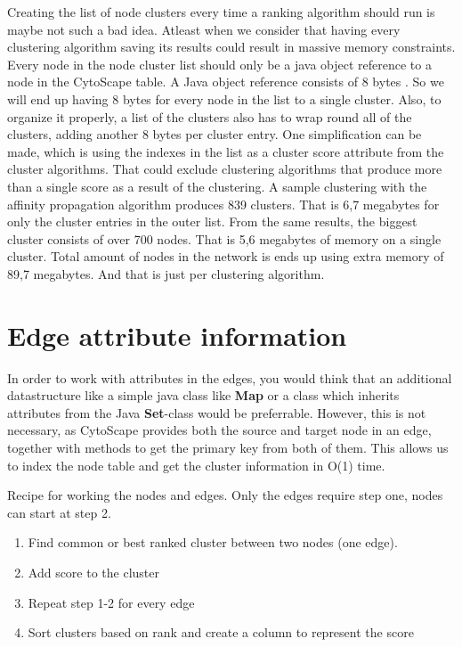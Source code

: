 Creating the list of node clusters every time a ranking algorithm should run is
maybe not such a bad idea. Atleast when we consider that having every clustering
algorithm saving its results could result in massive memory constraints. Every
node in the node cluster list should only be a java object reference to a node
in the CytoScape table. A Java object reference consists of 8 bytes
\cite{java-reference-size}. So we will end up having 8 bytes for every node in
the list to a single cluster. Also, to organize it properly, a list of the
clusters also has to wrap round all of the clusters, adding another 8 bytes per
cluster entry. One simplification can be made, which is using the indexes in the
list as a cluster score attribute from the cluster algorithms. That could
exclude clustering algorithms that produce more than a single score as a result
of the clustering. A sample clustering with the affinity propagation algorithm
produces 839 clusters. That is 6,7 megabytes for only the cluster entries in the
outer list. From the same results, the biggest cluster consists of over 700
nodes. That is 5,6 megabytes of memory on a single cluster. Total amount of
nodes in the network is ends up using extra memory of 89,7 megabytes. And that
is just per clustering algorithm.

\section{Edge attribute information}
In order to work with attributes in the edges, you would think that an
additional datastructure like a simple java class like \textbf{Map} or a class
which inherits attributes from the Java \textbf{Set}-class\cite{java-set} would
be preferrable. However, this is not necessary, as CytoScape provides both the
source and target node in an edge, together with methods to get the primary key
from both of them. This allows us to index the node table and get the cluster
information in O(1) time.

Recipe for working the nodes and edges. Only the edges require step one, nodes
can start at step 2.

\begin{enumerate}
    \item Find common or best ranked cluster between two nodes (one edge).
    \item Add score to the cluster
    \item Repeat step 1-2 for every edge
    \item Sort clusters based on rank and create a column to represent the score
\end{enumerate}

